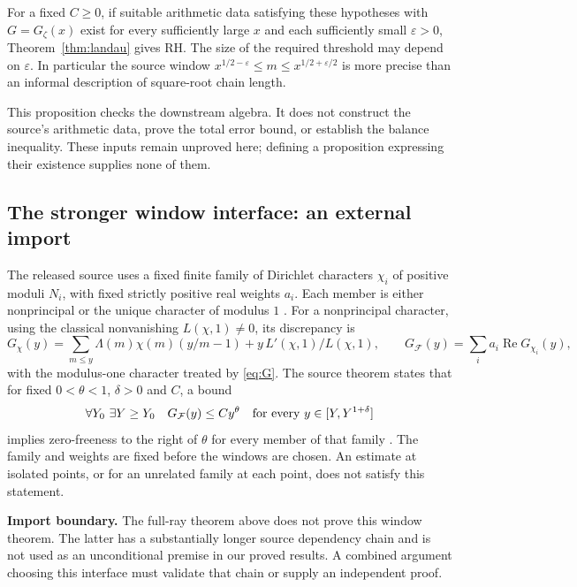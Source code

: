 \documentclass[11pt,letterpaper]{article}
\theoremstyle{definition}
\theoremstyle{remark}
\newcommand{\Rea}{\operatorname{Re}}
\numberwithin{equation}{section}
\begin{document}
For a fixed $C\ge0$, if suitable arithmetic data satisfying these hypotheses with $G=G_\zeta(x)$ exist for every sufficiently large $x$ and each sufficiently small $\varepsilon>0$, Theorem~\ref{thm:landau} gives RH. The size of the required threshold may depend on $\varepsilon$. In particular the source window
$x^{1/2-\varepsilon}\le m\le x^{1/2+\varepsilon/2}$ is more precise than an informal description of square-root chain length.

This proposition checks the downstream algebra. It does not construct the source's arithmetic data, prove the total error bound, or establish the balance inequality. These inputs remain unproved here; defining a proposition expressing their existence supplies none of them.

\subsection{The stronger window interface: an external import}
The released source uses a fixed finite family of Dirichlet characters $\chi_i$ of positive moduli $N_i$, with fixed strictly positive real weights $a_i$. Each member is either nonprincipal or the unique character of modulus $1$ \cite{externalfamily}. For a nonprincipal character, using the classical nonvanishing $L(\chi,1)\ne0$, its discrepancy is
\[
 G_\chi(y)=\sum_{m\le y}\Lambda(m)\chi(m)(y/m-1)
               +y\,L'(\chi,1)/L(\chi,1),\qquad
 G_{\mathcal F}(y)=\sum_i a_i\Rea G_{\chi_i}(y),
\]
with the modulus-one character treated by \eqref{eq:G}. The source theorem
 states that for fixed $0<\theta<1$, $\delta>0$ and $C$, a bound
\begin{equation}\label{eq:window}
 \forall Y_0\ \exists Y\ge Y_0\quad
 G_{\mathcal F}(y)\le Cy^\theta\quad
 \hbox{for every }y\in[Y,Y^{1+\delta}]
\end{equation}
implies zero-freeness to the right of $\theta$ for every member of that family \cite{externalwindow}. The family and weights are fixed before the windows are chosen. An estimate at isolated points, or for an unrelated family at each point, does not satisfy this statement.

\textbf{Import boundary.} The full-ray theorem above does not prove this window theorem. The latter has a substantially longer source dependency chain and is not used as an unconditional premise in our proved results. A combined argument choosing this interface must validate that chain or supply an independent proof.
\end{document}
